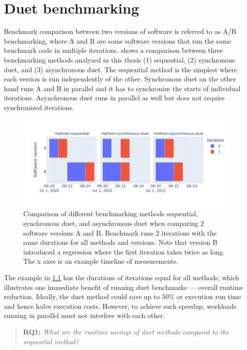 \chapter{Duet benchmarking}
\label{chap:duet}

Benchmark comparison between two versions of software is referred to as A/B benchmarking, where A and B are some software versions that run the same benchmark code in multiple iterations.
 shows a comparison between three benchmarking methods analyzed in this thesis (1) sequential, (2) synchronous duet, and (3) asynchronous duet.
The sequential method is the simplest where each version is run independently of the other.
Synchronous duet on the other hand runs A and B in parallel and it has to synchronize the starts of individual iterations.
Asynchronous duet runs in parallel as well but does not require synchronized iterations.

\begin{figure}
	\centering
	\includegraphics[width=.9\linewidth]{./figures/method_timeline.pdf}
	\caption{
	Comparison of different benchmarking methods sequential, synchronous duet, and asynchronous duet when comparing 2 software versions A and B.
	Benchmark runs 2 iterations with the same durations for all methods and versions.
	Note that version B introduced a regression where the first iteration takes twice as long.
	The x axes is an example timeline of measurements.
	}
	\label{fig:method_timeline}
\end{figure}

The example in \cref{fig:method_timeline} has the durations of iterations equal for all methods, which illustrates one immediate benefit of running duet benchmarks --- overall runtime reduction.
Ideally, the duet method could save up to $50\%$ or execution run time and hence halve execution costs.
However, to achieve such speedup, workloads running in parallel must not interfere with each other.

\begin{quote}
	\textbf{RQ1:} \emph{What are the runtime savings of duet methods compared to the sequential method?}
\end{quote}

